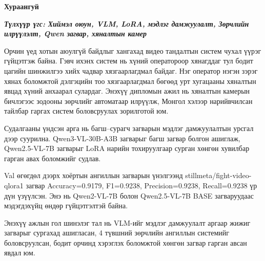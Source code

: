 \begin{center}
{\scshape\Large \univname\par}
{\scshape\large \facname\par}\vspace{0.5cm}
{\huge\textbf{{Хураангуй}} \par}
\bigskip
{\Large{\ttitle} \par}
\bigskip
{\normalsize \shortname \par}
\addressname
\end{center}
\textit{\textbf{Түлхүүр үгс: Хиймэл оюун, VLM, LoRA, мэдлэг дамжуулалт, Зөрчлийн илрүүлэлт, Qwen загвар, хяналтын камер}}
\bigskip

Орчин үед хотын аюулгүй байдлыг хангахад видео тандалтын систем чухал үүрэг гүйцэтгэж байна. Гэвч ихэнх систем нь хүний оператороор хянагддаг тул бодит цагийн шинжилгээ хийх чадвар хязгаарлагдмал байдаг. Нэг оператор нэгэн зэрэг хянах боломжтой дэлгэцийн тоо хязгаарлагдмал бөгөөд урт хугацааны хяналтын явцад хүний анхаарал сулардаг. Энэхүү дипломын ажил нь хяналтын камерын бичлэгээс зодооны зөрчлийг автоматаар илрүүлж, Монгол хэлээр нарийвчилсан тайлбар гаргах систем боловсруулах зорилготой юм.

Судалгааны үндсэн арга нь багш--сурагч загварын мэдлэг дамжуулалтын урсгал дээр суурилна. Qwen3-VL-30B-A3B загварыг багш загвар болгон ашиглаж, Qwen2.5-VL-7B загварыг LoRA нарийн тохируулгаар сурган хөнгөн хувилбар гарган авах боломжийг судлав.

Val өгөгдөл дээрх хоёртын ангиллын загварын үнэлгээнд stillmeta/fight-video-qlora1 загвар Accuracy=0.9179, F1=0.9238, Precision=0.9238, Recall=0.9238 үр дүн үзүүлсэн. Энэ нь Qwen2-VL-7B болон Qwen2.5-VL-7B BASE загваруудаас мэдэгдэхүйц өндөр гүйцэтгэлтэй байна.

Энэхүү ажлын гол шинэлэг тал нь VLM-ийг мэдлэг дамжуулалт аргаар жижиг загварыг сургахад ашигласан, 4 түвшний зөрчлийн ангиллын системийг боловсруулсан, бодит орчинд хэрэглэх боломжтой хөнгөн загвар гарган авсан явдал юм.
